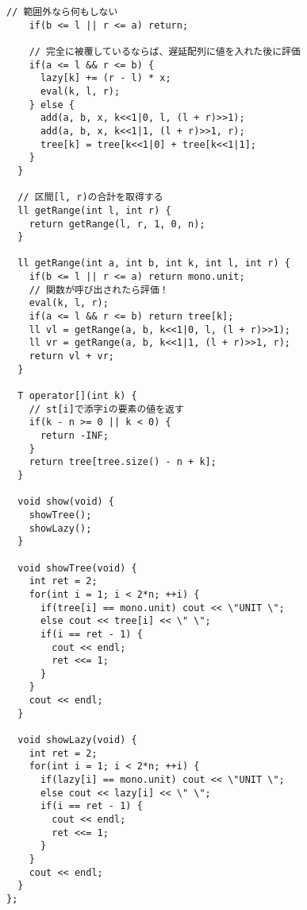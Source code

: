 \documentclass{jsarticle}
\begin{document}
\begin{lstlisting}[caption=LazySegmentTree]
    // 範囲外なら何もしない
    if(b <= l || r <= a) return;
    
    // 完全に被覆しているならば、遅延配列に値を入れた後に評価
    if(a <= l && r <= b) {
      lazy[k] += (r - l) * x;
      eval(k, l, r);
    } else {
      add(a, b, x, k<<1|0, l, (l + r)>>1);
      add(a, b, x, k<<1|1, (l + r)>>1, r);
      tree[k] = tree[k<<1|0] + tree[k<<1|1];
    }
  }

  // 区間[l, r)の合計を取得する
  ll getRange(int l, int r) {
    return getRange(l, r, 1, 0, n);
  }

  ll getRange(int a, int b, int k, int l, int r) {
    if(b <= l || r <= a) return mono.unit;
    // 関数が呼び出されたら評価！
    eval(k, l, r);
    if(a <= l && r <= b) return tree[k];
    ll vl = getRange(a, b, k<<1|0, l, (l + r)>>1);
    ll vr = getRange(a, b, k<<1|1, (l + r)>>1, r);
    return vl + vr;
  }

  T operator[](int k) {
    // st[i]で添字iの要素の値を返す
    if(k - n >= 0 || k < 0) {
      return -INF;
    }
    return tree[tree.size() - n + k];
  }

  void show(void) {
    showTree();
    showLazy();
  }

  void showTree(void) {
    int ret = 2;
    for(int i = 1; i < 2*n; ++i) {
      if(tree[i] == mono.unit) cout << \"UNIT \";
      else cout << tree[i] << \" \";
      if(i == ret - 1) {
        cout << endl;
        ret <<= 1;
      }
    }
    cout << endl;
  }

  void showLazy(void) {
    int ret = 2;
    for(int i = 1; i < 2*n; ++i) {
      if(lazy[i] == mono.unit) cout << \"UNIT \";
      else cout << lazy[i] << \" \";
      if(i == ret - 1) {
        cout << endl;
        ret <<= 1;
      }
    }
    cout << endl;
  }
};

\end{lstlisting}

\color{white}
\end{document}
